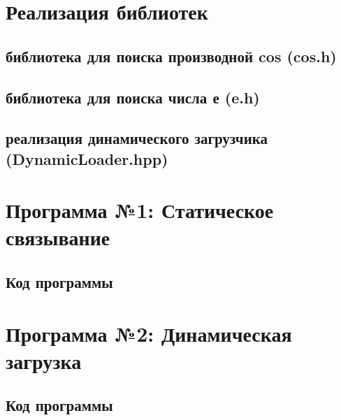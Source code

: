 \section{Реализация библиотек}

\subsection{библиотека для поиска производной cos (cos.h)}


\subsection{библиотека для поиска числа е (e.h)}


\subsection{реализация динамического загрузчика (DynamicLoader.hpp)}


\section{Программа №1: Статическое связывание}

\subsection{Код программы}


\section{Программа №2: Динамическая загрузка}

\subsection{Код программы}


